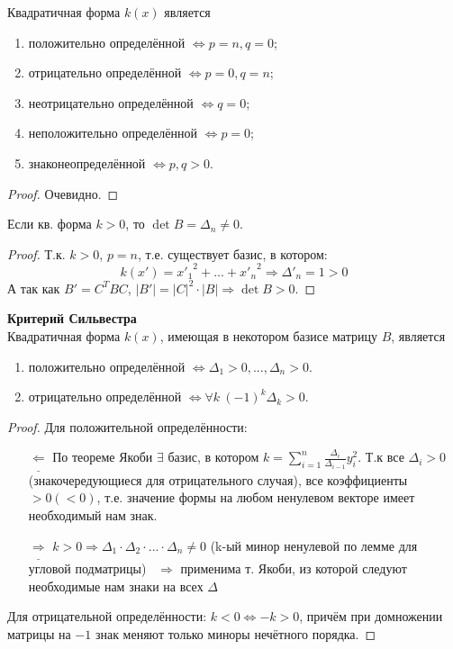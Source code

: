 \begin{subtheorem}
    Квадратичная форма $k(x)$ является
    \begin{enumerate}
        \item положительно определённой $\Longleftrightarrow  p = n, q = 0$;
        \item отрицательно определённой $\Longleftrightarrow  p = 0, q = n$;
        \item неотрицательно определённой $\Longleftrightarrow  q = 0$;
        \item неположительно определённой $\Longleftrightarrow  p = 0$;
        \item знаконеопределённой $\Longleftrightarrow  p,q > 0$.
    \end{enumerate}
\end{subtheorem}
\begin{proof}
    Очевидно.
\end{proof}
\begin{lemma}
    Если кв. форма $k > 0$, то $\det B = \Delta_n \neq 0$.
\end{lemma}
\begin{proof}
    Т.к. $k>0$, $p = n$, т.е. существует базис, в котором: $$k(x') = {x'_1}^2 + ... + {x'_n}^2 \Longrightarrow  \Delta'_n = 1 > 0$$
    А так как $B' = C^TBC$, $|B'| = |C|^2\cdot|B| \Longrightarrow  \det B > 0$.
\end{proof}
\begin{theorem} \textbf{Критерий Сильвестра}\\
    Квадратичная форма $k(x)$, имеющая в некотором базисе матрицу $B$, является
    \begin{enumerate}
        \item положительно определённой $\Leftrightarrow \Delta_1 > 0,...,\Delta_n > 0$.
        \item отрицательно определённой $\Leftrightarrow \forall k \ (-1)^k\Delta_k > 0$.
    \end{enumerate} 
\end{theorem}
\begin{proof} Для положительной определённости:
    \begin{itemize}
        \item[ $\underline{\Longleftarrow }$ ] По теореме Якоби $\exists$ базис, в котором $k = \sum \limits_{i=1}^{n} \frac{\Delta_i}{\Delta_{i-1}}y_i^2$. Т.к все $\Delta_i > 0$ (знакочередующиеся для отрицательного случая), все коэффициенты $> 0 (< 0)$, т.е. значение формы на любом ненулевом векторе имеет необходимый нам знак.
        \item[ $\underline{\Longrightarrow }$ ] $k>0 \Longrightarrow  \Delta_1\cdot\Delta_2\cdot...\cdot\Delta_n \neq 0$ (k-ый минор ненулевой по лемме для угловой подматрицы) \ $\Longrightarrow $ применима т. Якоби, из которой следуют необходимые нам знаки на всех $\Delta$
    \end{itemize}
    Для отрицательной определённости: $k < 0 \Leftrightarrow -k > 0$, причём при домножении матрицы на $-1$ знак меняют только миноры нечётного порядка. 
\end{proof}
